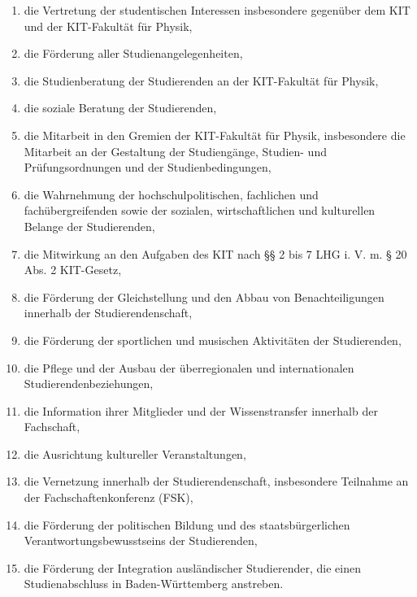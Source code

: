 \documentclass[a4paper, parskip=half, numbers=noenddot]{scrartcl}
\begin{document}
\begin{enumerate}
    \item die Vertretung der studentischen Interessen insbesondere gegenüber dem KIT und der KIT-Fakultät für Physik,
    
    \item die Förderung aller Studienangelegenheiten,
    
    \item die Studienberatung der Studierenden an der KIT-Fakultät für Physik,
    
    \item die soziale Beratung der Studierenden,
    
    \item die Mitarbeit in den Gremien der KIT-Fakultät für Physik, insbesondere die Mitarbeit an der Gestaltung der Studiengänge, Studien- und Prüfungsordnungen und der Studienbedingungen,
    
    \item die Wahrnehmung der hochschulpolitischen, fachlichen und fachübergreifenden sowie der sozialen, wirtschaftlichen und kulturellen Belange der Studierenden,
    
    \item die Mitwirkung an den Aufgaben des KIT nach §§ 2 bis 7 LHG i. V. m. § 20 Abs. 2 KIT-Gesetz,
    
    \item die Förderung der Gleichstellung und den Abbau von Benachteiligungen innerhalb der Studierendenschaft,
    
    \item die Förderung der sportlichen und musischen Aktivitäten der Studierenden,
    
    \item die Pflege und der Ausbau der überregionalen und internationalen Studierendenbeziehungen,
    
    \item die Information ihrer Mitglieder und der Wissenstransfer innerhalb der Fachschaft,
    \item die Ausrichtung kultureller Veranstaltungen,
    
    \item die Vernetzung innerhalb der Studierendenschaft, insbesondere Teilnahme an der Fachschaftenkonferenz (FSK),
    
    \item die Förderung der politischen Bildung und des staatsbürgerlichen Verantwortungsbewusstseins der Studierenden,
    
    \item die Förderung der Integration ausländischer Studierender, die einen Studienabschluss in Baden-Württemberg anstreben.

\end{enumerate}
\end{document}
